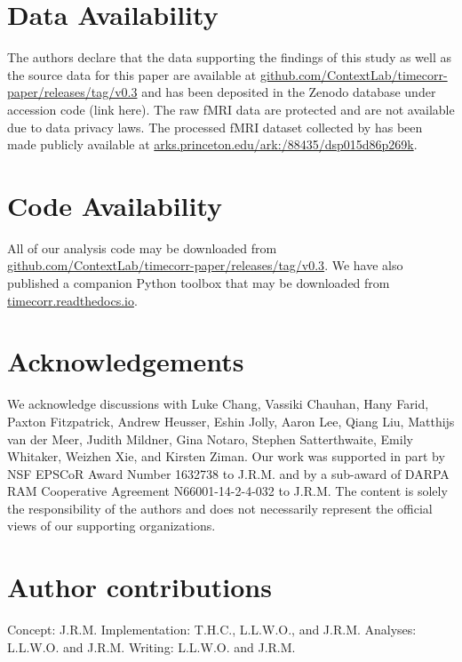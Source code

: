 \documentclass[english]{article}
\begin{document}
\section*{Data Availability}

The authors declare that the data supporting the findings of this
study as well as the source data for this paper are available at
\href{https://github.com/ContextLab/timecorr-paper/releases/tag/v0.3}{github.com/ContextLab/timecorr-paper/releases/tag/v0.3}
and has been deposited in the Zenodo database under accession code
(link here).
The raw fMRI data are protected and are not available due to data
privacy laws. The processed fMRI dataset collected by \cite{SimoEtal16} has been made publicly available at
\href{http://arks.princeton.edu/ark:/88435/dsp015d86p269k}{arks.princeton.edu/ark:/88435/dsp015d86p269k}. 

\section*{Code Availability}

All of our analysis code may be downloaded from
\href{https://github.com/ContextLab/timecorr-paper/releases/tag/v0.3}{github.com/ContextLab/timecorr-paper/releases/tag/v0.3}. We have also published a companion Python toolbox that may be downloaded from \href{https://timecorr.readthedocs.io}{timecorr.readthedocs.io}.


\section*{Acknowledgements}
We acknowledge discussions with Luke Chang, Vassiki Chauhan, Hany
Farid, Paxton Fitzpatrick, Andrew Heusser, Eshin Jolly, Aaron Lee,
Qiang Liu, Matthijs van der Meer, Judith Mildner, Gina Notaro, Stephen
Satterthwaite, Emily Whitaker, Weizhen Xie, and Kirsten Ziman. Our
work was supported in part by NSF EPSCoR Award Number 1632738 to
J.R.M. and by a sub-award of DARPA RAM Cooperative Agreement
N66001-14-2-4-032 to J.R.M.  The content is solely the responsibility
of the authors and does not necessarily represent the official views
of our supporting organizations.

\section*{Author contributions}
Concept: J.R.M.  Implementation: T.H.C., L.L.W.O., and J.R.M.
Analyses: L.L.W.O. and J.R.M.  Writing: L.L.W.O. and J.R.M.
\end{document}
